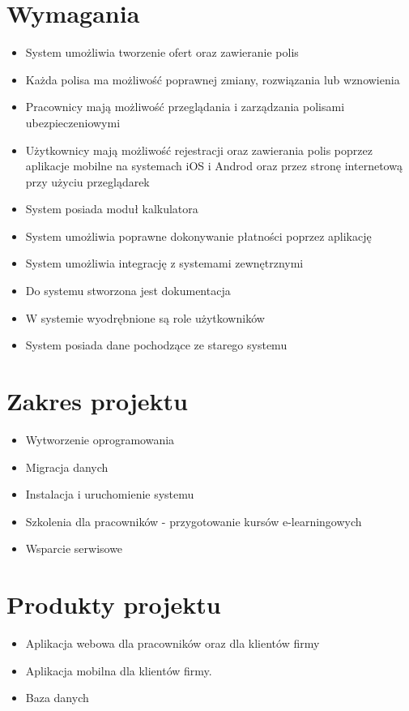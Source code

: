 \documentclass{article}
\begin{document}
\section{Wymagania}
\begin{itemize}
	\item System umożliwia tworzenie ofert oraz zawieranie polis
	\item Każda polisa ma możliwość poprawnej zmiany, rozwiązania lub wznowienia
	\item Pracownicy mają możliwość przeglądania i zarządzania polisami ubezpieczeniowymi
	\item Użytkownicy mają możliwość rejestracji oraz zawierania polis poprzez aplikacje mobilne na systemach iOS i Androd oraz przez stronę internetową przy użyciu przeglądarek
	\item System posiada moduł kalkulatora
	\item System umożliwia poprawne dokonywanie płatności poprzez aplikację
	\item System umożliwia integrację z systemami zewnętrznymi
	\item Do systemu stworzona jest dokumentacja
	\item W systemie wyodrębnione są role użytkowników
	\item System posiada dane pochodzące ze starego systemu
	
\end{itemize}

\section{Zakres projektu}
\begin{itemize}
	\item Wytworzenie oprogramowania
	\item Migracja danych
	\item Instalacja i uruchomienie systemu
	\item Szkolenia dla pracowników - przygotowanie kursów e-learningowych
	\item Wsparcie serwisowe
\end{itemize}

\section{Produkty projektu}
\begin{itemize}
	\item Aplikacja webowa dla pracowników oraz dla klientów firmy
	\item Aplikacja mobilna dla klientów firmy.
	\item Baza danych
\end{itemize}
\end{document}
